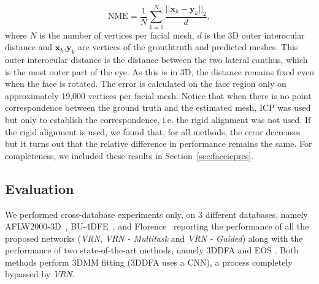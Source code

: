 \begin{equation}
  \textrm{NME} = \frac{1}{N} \sum_{k=1}^{N} \frac{||\mathbf{x}_k-\mathbf{y}_{k} ||_{2} }{d}, \label{eq:err}
\end{equation}
\label{eq:3d_nme}
where $N$ is the number of vertices per facial mesh, $d$ is the 3D
outer interocular distance and $\mathbf{x}_k$,$\mathbf{y}_k$ are
vertices of the grouthtruth and predicted meshes. This outer
interocular distance is the distance between the two lateral canthus,
which is the most outer part of the eye. As this is in 3D, the
distance remains fixed even when the face is rotated. The error is
calculated on the face region only on approximately 19,000 vertices
per facial mesh. Notice that when there is no point correspondence
between the ground truth and the estimated mesh, ICP was used but only
to establish the correspondence, i.e. the rigid alignment was not
used. If the rigid alignment is used, we found that, for all methods,
the error decreases but it turns out that the relative difference in
performance remains the same. For completeness, we included these
results in Section~\ref{sec:faceicpres}.


\subsection{Evaluation}

We performed cross-database experiments only, on 3 different
databases, namely AFLW2000-3D~\cite{zhu2016face},
BU-4DFE~\cite{yin2008high}, and Florence~\cite{masi2d3dFaceData}
reporting the performance of all the proposed networks (\textit{VRN},
\textit{VRN - Multitask} and \textit{VRN - Guided}) along with the
performance of two state-of-the-art methods, namely 3DDFA
\cite{zhu2016face} and EOS \cite{huber2016multiresolution}. Both
methods perform 3DMM fitting (3DDFA uses a CNN), a process completely
bypassed by \textit{VRN}.



